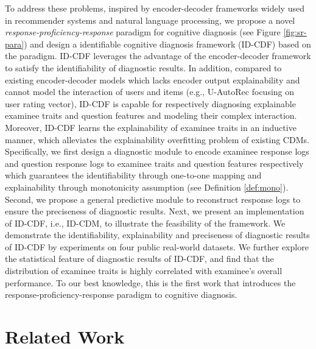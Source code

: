 \documentclass[sigconf]{acmart}
\begin{document}
\par To address these problems, inspired by encoder-decoder frameworks widely used in recommender systems and natural language processing, we propose a novel \textit{response-proficiency-response} paradigm for cognitive diagnosis (see Figure \ref{fig:sr-para}) and design a identifiable cognitive diagnosis framework (ID-CDF) based on the paradigm. ID-CDF leverages the advantage of the encoder-decoder framework to satisfy the identifiability of diagnostic results. In addition, compared to existing encoder-decoder models which lacks encoder output explainability and cannot model the interaction of users and items (e.g., U-AutoRec \cite{Sedhain2015} focusing on user rating vector), ID-CDF is capable for respectively diagnosing explainable examinee traits and question features and modeling their complex interaction. Moreover, ID-CDF learns the explainability of examinee traits in an inductive manner, which alleviates the explainability overfitting problem of existing CDMs. Specifically, we first design a diagnostic module to encode examinee response logs and question response logs to examinee traits and question features respectively which guarantees the identifiability through one-to-one mapping and explainability through monotonicity assumption (see Definition \ref{def:mono}). Second, we propose a general predictive module to reconstruct response logs to ensure the preciseness of diagnostic results. Next, we present an implementation of ID-CDF, i.e., ID-CDM, to illustrate the feasibility of the framework. We demonstrate the identifiability, explainability and preciseness of diagnostic results of ID-CDF by experiments on four public real-world datasets. We further explore the statistical feature of diagnostic results of ID-CDF, and find that the distribution of examinee traits is highly correlated with examinee's overall performance. To our best knowledge, this is the first work that introduces the response-proficiency-response paradigm to cognitive diagnosis. 


\vspace{-5pt}
\section{Related Work}
\end{document}
